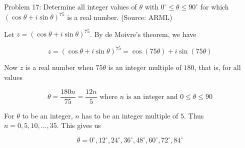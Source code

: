 Problem 17: Determine all integer values of $\theta$ with $0^\circ \le \theta \le 90^\circ$ for which $(\cos \theta + i \sin \theta)^{75}$ is a real number. (Source: ARML)

Let $z = (\cos \theta + i \sin \theta)^{75}$. By de Moivre's theorem, we have

$$ z = (\cos \theta + i \sin \theta)^{75} = \cos (75\theta) + i \sin (75\theta) $$

Now $z$ is a real number when $75\theta$ is an integer multiple of $180$, that is, for all values

$$ \theta = \frac{180n}{75} = \frac{12n}{5} \text{ where $n$ is an integer and } 0 \leq \theta \leq 90 $$

For $\theta$ to be an integer, $\displaystyle n$ has to be an integer multiple of $\displaystyle 5$. Thus $n = 0, 5, 10, ..., 35$. This gives us

$$ \boxed{\theta = 0^{\circ}, 12^{\circ}, 24^{\circ}, 36^{\circ}, 48^{\circ}, 60^{\circ}, 72^{\circ}, 84^{\circ}} $$
